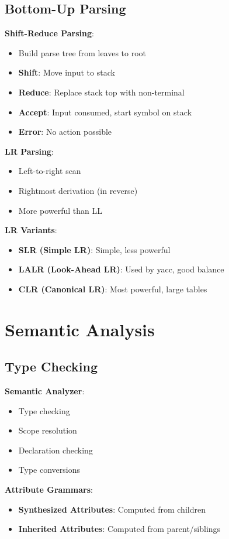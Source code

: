 \documentclass[12pt,a4paper]{report}
\begin{document}
\subsection{Bottom-Up Parsing}
\begin{concept}
\textbf{Shift-Reduce Parsing}:
\begin{itemize}
    \item Build parse tree from leaves to root
    \item \textbf{Shift}: Move input to stack
    \item \textbf{Reduce}: Replace stack top with non-terminal
    \item \textbf{Accept}: Input consumed, start symbol on stack
    \item \textbf{Error}: No action possible
\end{itemize}

\textbf{LR Parsing}:
\begin{itemize}
    \item Left-to-right scan
    \item Rightmost derivation (in reverse)
    \item More powerful than LL
\end{itemize}

\textbf{LR Variants}:
\begin{itemize}
    \item \textbf{SLR (Simple LR)}: Simple, less powerful
    \item \textbf{LALR (Look-Ahead LR)}: Used by yacc, good balance
    \item \textbf{CLR (Canonical LR)}: Most powerful, large tables
\end{itemize}
\end{concept}

\section{Semantic Analysis}

\subsection{Type Checking}
\begin{concept}
\textbf{Semantic Analyzer}:
\begin{itemize}
    \item Type checking
    \item Scope resolution
    \item Declaration checking
    \item Type conversions
\end{itemize}

\textbf{Attribute Grammars}:
\begin{itemize}
    \item \textbf{Synthesized Attributes}: Computed from children
    \item \textbf{Inherited Attributes}: Computed from parent/siblings
\end{itemize}
\end{concept}
\end{document}
